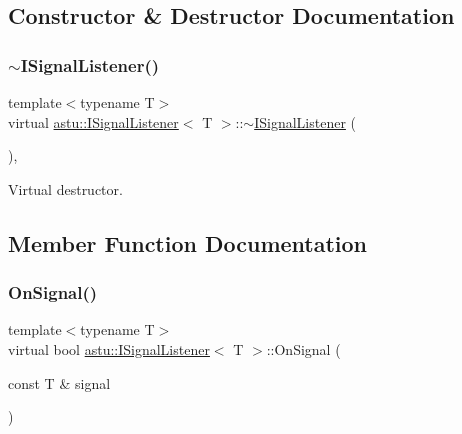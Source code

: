 \subsection{Constructor \& Destructor Documentation}
\mbox{\label{classastu_1_1ISignalListener_ae08b22a5ecb4f1db39336ab0c3139c68}} 
\subsubsection{\texorpdfstring{$\sim$\+I\+Signal\+Listener()}{~ISignalListener()}}
{\footnotesize\ttfamily template$<$typename T$>$ \\
virtual \hyperlink{classastu_1_1ISignalListener}{astu\+::\+I\+Signal\+Listener}$<$ T $>$\+::$\sim$\hyperlink{classastu_1_1ISignalListener}{I\+Signal\+Listener} (\begin{DoxyParamCaption}{ }\end{DoxyParamCaption})\hspace{0.3cm}{\ttfamily [inline]}, {\ttfamily [virtual]}}

Virtual destructor. 

\subsection{Member Function Documentation}
\mbox{\label{classastu_1_1ISignalListener_a2ae8168f23b6daa3416f6e5995fd5d31}} 
\subsubsection{\texorpdfstring{On\+Signal()}{OnSignal()}}
{\footnotesize\ttfamily template$<$typename T$>$ \\
virtual bool \hyperlink{classastu_1_1ISignalListener}{astu\+::\+I\+Signal\+Listener}$<$ T $>$\+::On\+Signal (\begin{DoxyParamCaption}\item[{const T \&}]{signal }\end{DoxyParamCaption})\hspace{0.3cm}{\ttfamily [pure virtual]}}

